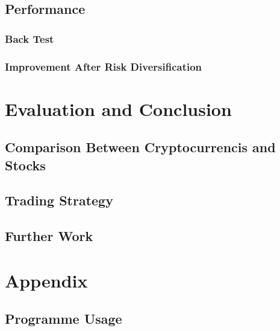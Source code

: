 \documentclass[11pt]{article} %
\theoremstyle{plain}
\theoremstyle{definition}
\begin{document}
\subsection{Performance}
\subsubsection{Back Test}
\subsubsection{Improvement After Risk Diversification}

\clearpage

\section{Evaluation and Conclusion}
\subsection{Comparison Between Cryptocurrencis and Stocks}
\subsection{Trading Strategy}
\subsection{Further Work}

\section{Appendix}
\subsection{Programme Usage}



\end{document}
